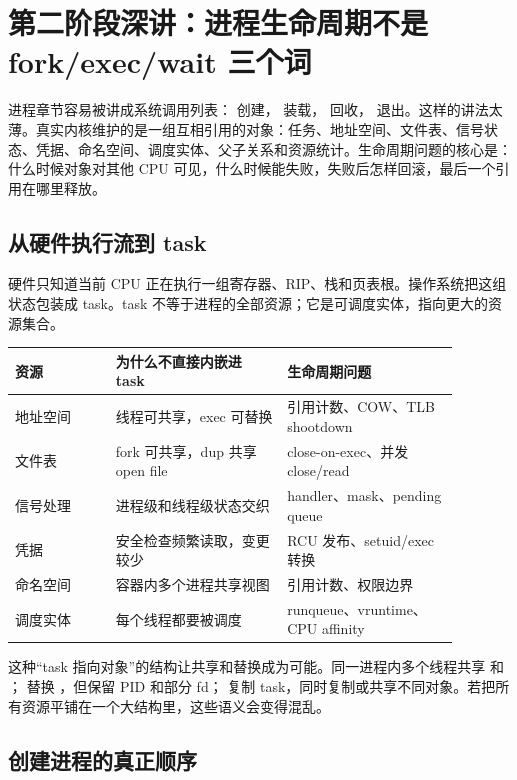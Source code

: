 \section{第二阶段深讲：进程生命周期不是 fork/exec/wait 三个词}

进程章节容易被讲成系统调用列表： 创建， 装载， 回收， 退出。这样的讲法太薄。真实内核维护的是一组互相引用的对象：任务、地址空间、文件表、信号状态、凭据、命名空间、调度实体、父子关系和资源统计。生命周期问题的核心是：什么时候对象对其他 CPU 可见，什么时候能失败，失败后怎样回滚，最后一个引用在哪里释放。

\subsection{从硬件执行流到 task}

硬件只知道当前 CPU 正在执行一组寄存器、RIP、栈和页表根。操作系统把这组状态包装成 task。task 不等于进程的全部资源；它是可调度实体，指向更大的资源集合。

\begin{longtable}{|p{0.2\linewidth}|p{0.34\linewidth}|p{0.34\linewidth}|}
\toprule
资源 & 为什么不直接内嵌进 task & 生命周期问题 \\
\midrule
地址空间 & 线程可共享，exec 可替换 & 引用计数、COW、TLB shootdown \\\tablerowrule
文件表 & fork 可共享，dup 共享 open file & close-on-exec、并发 close/read \\\tablerowrule
信号处理 & 进程级和线程级状态交织 & handler、mask、pending queue \\\tablerowrule
凭据 & 安全检查频繁读取，变更较少 & RCU 发布、setuid/exec 转换 \\\tablerowrule
命名空间 & 容器内多个进程共享视图 & 引用计数、权限边界 \\\tablerowrule
调度实体 & 每个线程都要被调度 & runqueue、vruntime、CPU affinity \\
\bottomrule
\end{longtable}

这种“task 指向对象”的结构让共享和替换成为可能。同一进程内多个线程共享  和 ； 替换 ，但保留 PID 和部分 fd； 复制 task，同时复制或共享不同对象。若把所有资源平铺在一个大结构里，这些语义会变得混乱。

\subsection{创建进程的真正顺序}

